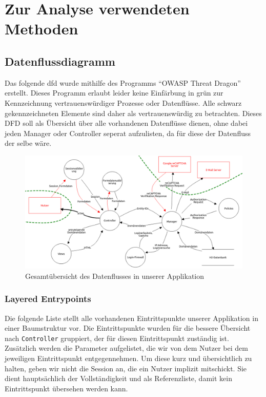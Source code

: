 \documentclass[12pt,DIV14,BCOR10mm,a4paper,parskip=half-,headsepline,headinclude,english,ngerman,bibliography=totocnumbered]{scrreprt}
\begin{document}
\vspace*{-3cm}

\tableofcontents  %

\chapter{Zur Analyse verwendeten Methoden}
\section{Datenflussdiagramm}

Das folgende \gls{dfd} wurde mithilfe des Programms \enquote{OWASP Threat Dragon} \autocite{OWASP.ThreatDragon} erstellt.
Dieses Programm erlaubt leider keine Einfärbung in grün zur Kennzeichnung vertrauenswürdiger Prozesse oder Datenflüsse.
Alle schwarz gekennzeichneten Elemente sind daher als vertrauenswürdig zu betrachten.
Dieses DFD soll als Übersicht über alle vorhandenen Datenflüsse dienen, ohne dabei jeden Manager oder Controller seperat aufzulisten, da für diese der Datenfluss der selbe wäre.

\begin{figure}[htbp]
  \hspace*{-2.5cm}
  \label{overview-dfd-pic}
  \includegraphics[width=1.25\linewidth]{resources/overview-dfd.jpg}
  \caption{Gesamtübersicht des Datenflusses in unserer Applikation}
\end{figure}

\subsection{Layered Entrypoints}

Die folgende Liste stellt alle vorhandenen Eintrittspunkte unserer Applikation in einer Baumstruktur vor.
Die Eintrittspunkte wurden für die bessere Übersicht nach \texttt{Controller} gruppiert, der für diesen Eintrittspunkt zuständig ist.
Zusätzlich werden die Parameter aufgelistet, die wir von dem Nutzer bei dem jeweiligen Eintrittspunkt entgegennehmen. Um diese kurz und übersichtlich zu halten, geben wir nicht die Session an, die ein Nutzer implizit mitschickt.
Sie dient hauptsächlich der Vollständigkeit und als Referenzliste, damit kein Eintrittspunkt übersehen werden kann.
\end{document}

